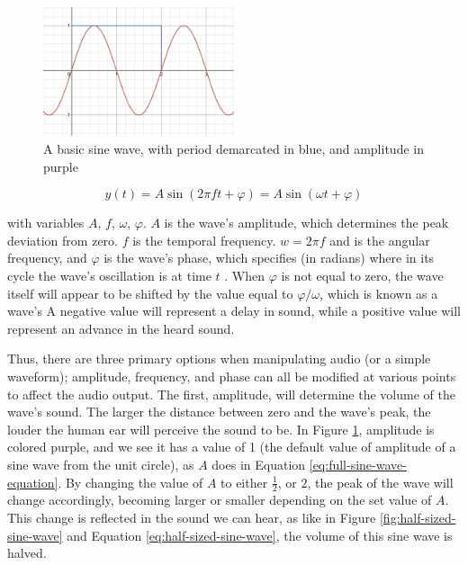 \begin{figure}
	\centering
	\includegraphics[width=0.5\textwidth]{figures/sine-wave-period-amplitude.png}
	\caption{A basic sine wave, with period demarcated in blue, and amplitude in purple}
	\label{fig:sine-wave-period-amplitude}
\end{figure}

\begin{equation}\label{eq:full-sine-wave-equation}
	y(t) = A \sin(2\pi ft + \varphi) = A\sin(\omega t + \varphi)
\end{equation}

with variables $A$, $f$, $\omega$, $\varphi$. $A$ is the wave's amplitude, which determines the peak deviation from zero. $f$ is the temporal frequency. $w = 2\pi f$ and is the angular frequency, and $\varphi$ is the wave's phase, which specifies (in radians) where in its cycle the wave's oscillation is at time $t$ \cite{Kirk_Hunt_2013}. When $\varphi$ is not equal to zero, the wave itself will appear to be shifted by the value equal to $\varphi / \omega$, which is known as a wave's  A negative value will represent a delay in sound, while a positive value will represent an advance in the heard sound.

Thus, there are three primary options when manipulating audio (or a simple waveform); amplitude, frequency, and phase can all be modified at various points to affect the audio output. The first, amplitude, will determine the volume of the wave's sound. The larger the distance between zero and the wave's peak, the louder the human ear will perceive the sound to be\cite{Zjalic_2021}. In Figure \ref{fig:sine-wave-period-amplitude}, amplitude is colored purple, and we see it has a value of 1 (the default value of amplitude of a sine wave from the unit circle), as $A$ does in Equation \ref{eq:full-sine-wave-equation}. By changing the value of $A$ to either $\frac{1}{2}$, or $2$, the peak of the wave will change accordingly, becoming larger or smaller depending on the set value of $A$. This change is reflected in the sound we can hear, as like in Figure \ref{fig:half-sized-sine-wave} and Equation \ref{eq:half-sized-sine-wave}, the volume of this sine wave is halved.

